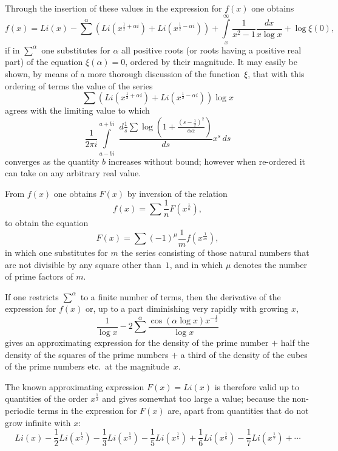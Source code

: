 \documentclass[a4paper,12pt]{article}
\begin{document}
Through the insertion of these values in the expression for $f(x)$
one obtains
\[ f(x) = {Li}(x) - {\textstyle\sum^\alpha} \left(
            {Li} \left( x^{\frac{1}{2} + \alpha i} \right)
            + {Li} \left( x^{\frac{1}{2} - \alpha i} \right)
            \right)
         + \int\limits_x^\infty \frac{1}{x^2 - 1} \frac{dx}{x \log x}
         + \log \xi(0),\]
if in $\sum^\alpha$ one substitutes for $\alpha$ all positive roots
(or roots having a positive real part) of the equation $\xi(\alpha) = 0$,
ordered by their magnitude.  It may easily be shown,
by means of a more thorough discussion of the function~$\xi$, that
with this ordering of terms the value of the series
\[ {\textstyle\sum} \left(
            {Li} \left( x^{\frac{1}{2} + \alpha i} \right)
            + {Li} \left( x^{\frac{1}{2} - \alpha i} \right)
            \right) \log x \]
agrees with the limiting value to which
\[ \frac{1}{2\pi i} \int\limits_{a - bi}^{a + bi} \, \,
      \frac{\displaystyle d \frac{1}{s} {\textstyle\sum}
         \log \left( 1 + \frac{(s - \frac{1}{2})^2}{\alpha \alpha}
         \right)}{ds} x^s \,ds \]
converges as the quantity $b$ increases without bound; however
when re-ordered it can take on any arbitrary real value.

From $f(x)$ one obtains $F(x)$ by inversion of the relation
\[ f(x) = {\textstyle\sum} \frac{1}{n}
         F \left( x^{\frac{1}{n}} \right),\]
to obtain the equation
\[ F(x) = {\textstyle\sum} (-1)^\mu \frac{1}{m}
         f \left( x^{\frac{1}{m}} \right),\]
in which one substitutes for $m$ the series consisting
of those natural numbers that are not divisible by any square
other than~$1$, and in which $\mu$ denotes the number of prime factors
of $m$.

If one restricts $\sum^\alpha$ to a finite number of terms, then the
derivative of the expression for $f(x)$ or, up to a part
diminishing very rapidly with growing $x$,
\[ \frac{1}{\log x} - 2 {\textstyle\sum^\alpha}
         \frac{ \cos (\alpha \log x) x^{-\frac{1}{2}}}{\log x} \]
gives an approximating expression for the density of the
prime number $+$ half the density of the squares of the prime
numbers $+$ a third of the density of the cubes of the prime
numbers etc.\ at the magnitude~$x$.

The known approximating expression $F(x) = {Li}(x)$ is therefore
valid up to quantities of the order $x^{\frac{1}{2}}$ and gives
somewhat too large a value; because the non-periodic terms in the
expression for $F(x)$ are, apart from quantities that do
not grow infinite with $x$:
\[ {Li}(x) - {\textstyle\frac{1}{2}}{Li}(x^{\frac{1}{2}})
           - {\textstyle\frac{1}{3}}{Li}(x^{\frac{1}{3}})
           - {\textstyle\frac{1}{5}}{Li}(x^{\frac{1}{5}})
           + {\textstyle\frac{1}{6}}{Li}(x^{\frac{1}{6}})
           - {\textstyle\frac{1}{7}}{Li}(x^{\frac{1}{7}})
           + \cdots \]
\end{document}
